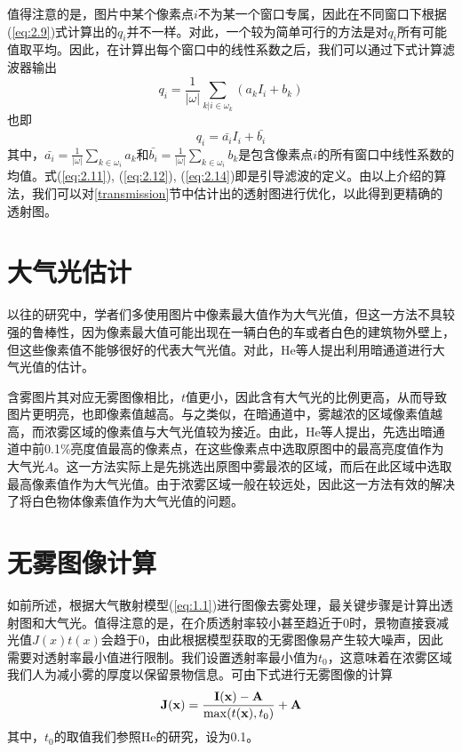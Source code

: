 \documentclass[a4paper, 12pt, oneside]{report}
\begin{document}
{值得注意的是，图片中某个像素点$i$不为某一个窗口专属，因此在不同窗口下根据(\ref{eq:2.9})式计算出的$q_i$并不一样。对此，一个较为简单可行的方法是对$q_i$所有可能值取平均。因此，在计算出每个窗口中的线性系数之后，我们可以通过下式计算滤波器输出
\begin{equation} \label{eq:2.13}
q_i = \frac{1}{|\omega|}\sum_{k|i\in \omega_k}(a_k I_i + b_k)
\end{equation}
也即
\begin{equation} \label{eq:2.14}
q_i = \bar{a_i}I_i + \bar{b_i}
\end{equation}
其中，$\bar{a_i} = \frac{1}{|\omega|}\sum_{k\in \omega_i}a_k$和$\bar{b_i} = \frac{1}{|\omega|}\sum_{k\in \omega_i}b_k$是包含像素点$i$的所有窗口中线性系数的均值。式(\ref{eq:2.11}), (\ref{eq:2.12}), (\ref{eq:2.14})即是引导滤波的定义。由以上介绍的算法，我们可以对\ref{transmission}节中估计出的透射图进行优化，以此得到更精确的透射图。

\section{大气光估计\quad}
以往的研究中，学者们多使用图片中像素最大值作为大气光值，但这一方法不具较强的鲁棒性，因为像素最大值可能出现在一辆白色的车或者白色的建筑物外壁上，但这些像素值不能够很好的代表大气光值。对此，He等人提出利用暗通道进行大气光值的估计。

含雾图片其对应无雾图像相比，$t$值更小，因此含有大气光的比例更高，从而导致图片更明亮，也即像素值越高。与之类似，在暗通道中，雾越浓的区域像素值越高，而浓雾区域的像素值与大气光值较为接近。由此，He等人提出，先选出暗通道中前0.1\%亮度值最高的像素点，在这些像素点中选取原图中的最高亮度值作为大气光$A$。这一方法实际上是先挑选出原图中雾最浓的区域，而后在此区域中选取最高像素值作为大气光值。由于浓雾区域一般在较远处，因此这一方法有效的解决了将白色物体像素值作为大气光值的问题。

\section{无雾图像计算\quad}
如前所述，根据大气散射模型(\ref{eq:1.1})进行图像去雾处理，最关键步骤是计算出透射图和大气光。值得注意的是，在介质透射率较小甚至趋近于0时，景物直接衰减光值$J(x)t(x)$会趋于0，由此根据模型获取的无雾图像易产生较大噪声，因此需要对透射率最小值进行限制。我们设置透射率最小值为$t_0$，这意味着在浓雾区域我们人为减小雾的厚度以保留景物信息。可由下式进行无雾图像的计算
\begin{equation} \label{eq:2.15}
{\bf J(x)} = \frac{\bf I(x) - A}{\max(t({\bf x}), t_0)} + {\bf A}
\end{equation}
其中，$t_0$的取值我们参照He的研究，设为0.1。

}
\end{document}
